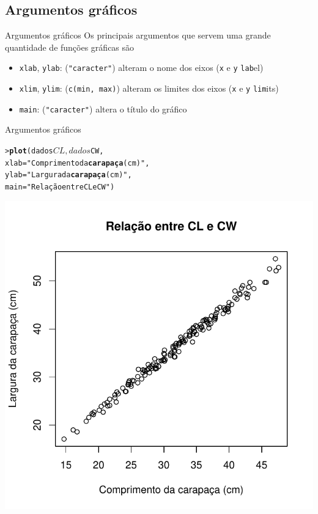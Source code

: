 \documentclass[10pt]{beamer}\usepackage{graphicx, color}
\makeatletter
\newcommand{\hlfunctioncall}[1]{\textcolor[rgb]{0,0,0.545098039215686}{\textbf{#1}}}%
\newcommand{\hlstring}[1]{\textcolor[rgb]{0.282352941176471,0.23921568627451,0.545098039215686}{#1}}%
\newenvironment{kframe}{%
 \def\at@end@of@kframe{}%
 \ifinner\ifhmode%
  \def\at@end@of@kframe{\end{minipage}}%
  \begin{minipage}{\columnwidth}%
 \fi\fi%
 \def\FrameCommand##1{\hskip\@totalleftmargin \hskip-\fboxsep
 \colorbox{shadecolor}{##1}\hskip-\fboxsep
     \hskip-\linewidth \hskip-\@totalleftmargin \hskip\columnwidth}%
 \MakeFramed {\advance\hsize-\width
   \@totalleftmargin\z@ \linewidth\hsize
   \@setminipage}}%
 {\par\unskip\endMakeFramed%
 \at@end@of@kframe}
\newenvironment{knitrout}{}{} %
\makeatother
\begin{document}
\subsection{Argumentos gráficos}

\begin{frame}[fragile=singleslide]{Argumentos gráficos}
  Os principais argumentos que servem uma grande quantidade de funções
  gráficas são
  \begin{itemize}
  \item \texttt{xlab}, \texttt{ylab}: (\verb|"caracter"|) alteram o nome
    dos eixos (\texttt{x} e \texttt{y} \texttt{lab}el)
  \item \texttt{xlim}, \texttt{ylim}: (\verb|c(min, max)|) alteram os
    limites dos eixos (\texttt{x} e \texttt{y} \texttt{lim}its)
  \item \texttt{main}: (\verb|"caracter"|) altera o título do gráfico
  \end{itemize}
\end{frame}

\begin{frame}[fragile=singleslide]{Argumentos gráficos}
\begin{knitrout}\small
{}\color{fgcolor}\begin{kframe}
\begin{alltt}
> \hlfunctioncall{plot}(dados$CL, dados$CW,
       xlab = \hlstring{"Comprimento da \hlfunctioncall{carapaça} (cm)"},
       ylab = \hlstring{"Largura da \hlfunctioncall{carapaça} (cm)"},
       main = \hlstring{"Relação entre CL e CW"})
\end{alltt}
\end{kframe}

{\centering \includegraphics[width=.55\textwidth]{figure/unnamed-chunk-37} 

}


\end{knitrout}

\end{frame}
\end{document}
